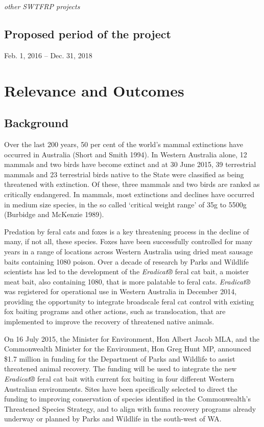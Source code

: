 \documentclass[version=last,
    paper=a4,                               %
    10pt,                                   %
    dvipsnames,
    oneside,                              %
    headings=openany,                       %
    open=any,
    BCOR=7mm,                               %
    DIV=15,     %
]{scrbook}
\begin{document}
\emph{other SWTFRP projects}


\subsection*{Proposed period of the project}
Feb. 1, 2016 -- Dec. 31, 2018



\section*{Relevance and Outcomes}


\subsection*{Background}

Over the last 200 years, 50 per cent of the world's mammal extinctions
have occurred in Australia (Short and Smith 1994). In Western Australia
alone, 12 mammals and two birds have become extinct and at 30 June 2015,
39 terrestrial mammals and 23 terrestrial birds native to the State were
classified as being threatened with extinction. Of these, three mammals
and two birds are ranked as critically endangered. In mammals, most
extinctions and declines have occurred in medium size species, in the so
called `critical weight range' of 35g to 5500g (Burbidge and McKenzie
1989).

Predation by feral cats and foxes is a key threatening process in the
decline of many, if not all, these species. Foxes have been successfully
controlled for many years in a range of locations across Western
Australia using dried meat sausage baits containing 1080 poison. Over a
decade of research by Parks and Wildlife scientists has led to the
development of the \emph{Eradicat®} feral cat bait, a moister meat bait,
also containing 1080, that is more palatable to feral cats.
\emph{Eradicat®} was registered for operational use in Western Australia
in December 2014, providing the opportunity to integrate broadscale
feral cat control with existing fox baiting programs and other actions,
such as translocation, that are implemented to improve the recovery of
threatened native animals.~

On 16 July 2015, the Minister for Environment, Hon Albert Jacob MLA, and
the Commonwealth Minister for the Environment, Hon Greg Hunt MP,
announced \$1.7 million in funding for the Department of Parks and
Wildlife to assist threatened animal recovery. The funding will be used
to integrate the new \emph{Eradicat®} feral cat bait with current fox
baiting in four different Western Australian environments. Sites have
been specifically selected to direct the funding to improving
conservation of species identified in the Commonwealth's Threatened
Species Strategy, and to align with fauna recovery programs already
underway or planned by Parks and Wildlife in the south-west of WA.
\end{document}
